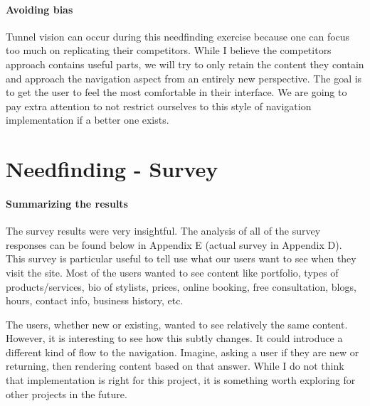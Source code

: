 \paragraph{Avoiding bias}
Tunnel vision can occur during this needfinding exercise because one can focus too much on replicating their competitors. While I believe the competitors approach contains useful parts, we will try to only retain the content they contain and approach the navigation aspect from an entirely new perspective. The goal is to get the user to feel the most comfortable in their interface. We are going to pay extra attention to not restrict ourselves to this style of navigation implementation if a better one exists.


\section{Needfinding - Survey}

\paragraph{Summarizing the results}
The survey results were very insightful. The analysis of all of the survey responses can be found below in Appendix E (actual survey in Appendix D). This survey is particular useful to tell use what our users want to see when they visit the site. Most of the users wanted to see content like portfolio, types of products/services, bio of stylists, prices, online booking, free consultation, blogs, hours, contact info, business history, etc.

The users, whether new or existing, wanted to see relatively the same content. However, it is interesting to see how this subtly changes. It could introduce a different kind of flow to the navigation. Imagine, asking a user if they are new or returning, then rendering content based on that answer. While I do not think that implementation is right for this project, it is something worth exploring for other projects in the future.

